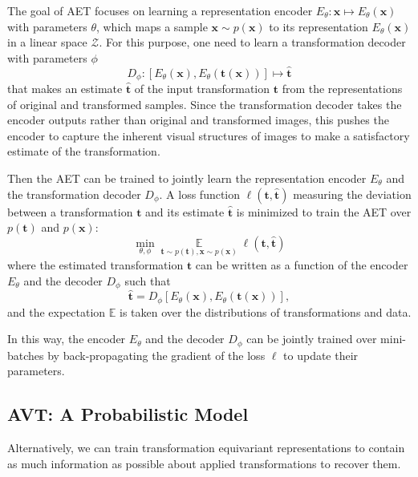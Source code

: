 \documentclass[10pt,journal,compsoc,twoside]{IEEEtran}
\begin{document}
The goal of AET focuses on learning a representation encoder $E_\theta: \mathbf x \mapsto E_\theta(\mathbf x)$ with parameters $\theta$, which maps a sample $\mathbf x\sim p(\mathbf x)$ to its representation $E_\theta(\mathbf x)$ in a linear space $\mathcal Z$.
For this purpose, one need to learn a transformation decoder with parameters $\phi$
$$
D_\phi: \left[E_\theta(\mathbf x), E_\theta(\mathbf t(\mathbf x))\right]\mapsto \hat {\mathbf t}
$$
that makes an estimate $\hat{\mathbf t}$ of the input transformation $\mathbf t$ from the representations of original and transformed samples. Since the transformation decoder takes the encoder outputs rather than original and transformed images, this pushes the encoder to capture the inherent visual structures of images to make a satisfactory estimate of the transformation.

Then the AET can be trained to jointly learn the representation encoder $E_\theta$ and the transformation decoder $D_\phi$. A loss function $\ell(\mathbf t, \hat{\mathbf t})$ measuring the deviation between a transformation $\mathbf t$ and its estimate $\hat{\mathbf t}$ is minimized to train the AET over $p(\mathbf t)$ and $p(\mathbf x)$:
\begin{equation}\label{eq:AET_loss}
\min_{\theta,\phi} \mathop\mathbb E\limits_{\mathbf t \sim p(\mathbf t), \mathbf x\sim p(\mathbf x)}\ell(\mathbf t, \hat{\mathbf t})
\end{equation}
where the estimated transformation $\hat{\mathbf t}$ can be written as a function of the encoder $E_\theta$ and the decoder $D_\phi$ such that
$$
\hat{\mathbf t}= D_\phi\left[E_\theta(\mathbf x), E_\theta(\mathbf t(\mathbf x))\right],
$$
and the expectation $\mathbb E$ is taken over the distributions of transformations and data.

In this way, the encoder $E_\theta$ and the decoder $D_\phi$ can be jointly trained over mini-batches by back-propagating the gradient of the loss $\ell$ to update their parameters.

\subsection{AVT: A Probabilistic Model}

Alternatively, we can train transformation equivariant representations to contain as much information as possible about applied transformations to recover them.
\end{document}
